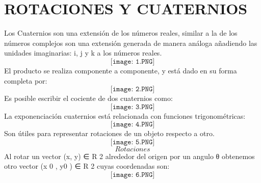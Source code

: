 \documentclass[12pt,a4paper]{article}
\begin{document}
\section{ROTACIONES Y CUATERNIOS}
Los Cuaternios son una extensión de los números reales, similar a la de los números complejos son una extensión generada de manera análoga añadiendo las unidades imaginarias: i, j y k a los números reales.
$$\texttt{[image: 1.PNG]} $$ 
El producto se realiza componente a componente, y está dado en su forma completa por:
$$\texttt{[image: 2.PNG]}  $$
 Es posible escribir el cociente de dos cuaternios como:
 $$\texttt{[image: 3.PNG]}$$ 
 La exponenciación cuaternios está relacionada con funciones trigonométricas:
 $$\texttt{[image: 4.PNG]} $$
 Son útiles para representar rotaciones de un objeto respecto a otro.
 $$\texttt{[image: 5.PNG]} $$
 $$Rotaciones$$
 Al rotar un vector (x, y) ∈ R 2 alrededor del origen por un angulo θ obtenemos otro vector (x 0 , y0 ) ∈ R 2 cuyas coordenadas son:
 $$\texttt{[image: 6.PNG]} $$


\end{document}
